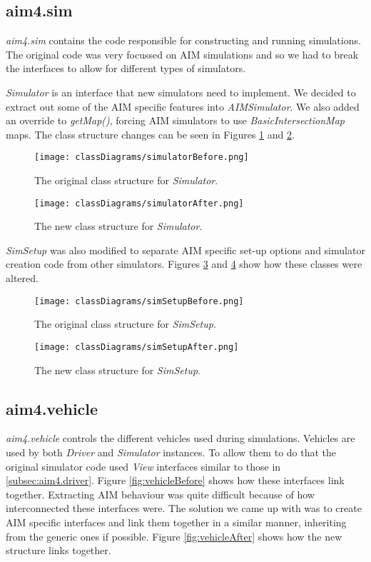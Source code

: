 \subsection{aim4.sim}
\label{subsec:aim4.sim}
\emph{aim4.sim} contains the code responsible for constructing and running simulations. The original code was very focussed on AIM simulations and so we had to break the interfaces to allow for different types of simulators. 

\emph{Simulator} is an interface that new simulators need to implement. We decided to extract out some of the AIM specific features into \emph{AIMSimulator}. We also added an override to \emph{getMap()}, forcing AIM simulators to use \emph{BasicIntersectionMap} maps. The class structure changes can be seen in Figures \ref{fig:simulatorBefore} and \ref{fig:simulatorAfter}.

\begin{figure}[htb]
\texttt{[image: classDiagrams/simulatorBefore.png]}
\caption{The original class structure for \emph{Simulator}.}
\label{fig:simulatorBefore}
\end{figure}

\begin{figure}[htb]
\texttt{[image: classDiagrams/simulatorAfter.png]}
\caption{The new class structure for \emph{Simulator}.}
\label{fig:simulatorAfter}
\end{figure}

\emph{SimSetup} was also modified to separate AIM specific set-up options and simulator creation code from other simulators. Figures \ref{fig:simSetupBefore} and \ref{fig:simSetupAfter} show how these classes were altered.

\begin{figure}[htb]
\texttt{[image: classDiagrams/simSetupBefore.png]}
\caption{The original class structure for \emph{SimSetup}.}
\label{fig:simSetupBefore}
\end{figure}

\begin{figure}[htb]
\texttt{[image: classDiagrams/simSetupAfter.png]}
\caption{The new class structure for \emph{SimSetup}.}
\label{fig:simSetupAfter}
\end{figure}

\subsection{aim4.vehicle}
\label{subsec:aim4.vehicle}
\emph{aim4.vehicle} controls the different vehicles used during simulations. Vehicles are used by both \emph{Driver} and \emph{Simulator} instances. To allow them to do that the original simulator code used \emph{View} interfaces similar to those in \ref{subsec:aim4.driver}. Figure \ref{fig:vehicleBefore} shows how these interfaces link together. Extracting AIM behaviour was quite difficult because of how interconnected these interfaces were. The solution we came up with was to create AIM specific interfaces and link them together in a similar manner, inheriting from the generic ones if possible. Figure \ref{fig:vehicleAfter} shows how the new structure links together.

